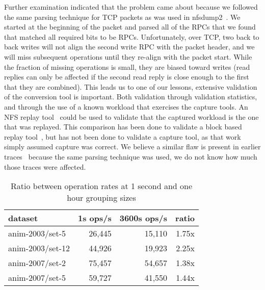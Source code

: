 Further examination indicated that the problem came about because we
followed the same parsing technique for TCP packets as was used in
nfsdump2~\cite{ellardTraces}.  We started at the beginning of the
packet and parsed all of the RPCs that we found that matched all
required bits to be RPCs.  Unfortunately, over TCP, two back to back
writes will not align the second write RPC with the packet header, and
we will miss subsequent operations until they re-align with the packet
start.  While the fraction of missing operations is small, they are
biased toward writes (read replies can only be affected if the second
read reply is close enough to the first that they are combined).  This
leads us to one of our lessons, extensive validation of the conversion
tool is important.  Both validation through validation statistics, and
through the use of a known workload that exercises the capture tools.
An NFS replay tool~\cite{NingningFast05} could be used to validate
that the captured workload is the one that was replayed.  This
comparison has been done to validate a block based replay
tool~\cite{AndersonFast04}, but has not been done to validate a
capture tool, as that work simply assumed capture was correct.
We believe a similar
flaw is present in earlier traces~\cite{ellardTraces} because the same
parsing technique was used, we do not know how much those traces were
affected.

\begin{table}
\begin{tabular}{|l|r|r|r|}
\hline
dataset & 1s ops/s & 3600s ops/s & ratio \\
\hline
anim-2003/set-5  & 26,445 & 15,110 & 1.75x \\
anim-2003/set-12 & 44,926 & 19,923 & 2.25x \\
anim-2007/set-2  & 75,457 & 54,657 & 1.38x \\
anim-2007/set-5  & 59,727 & 41,550 & 1.44x \\
\hline
\end{tabular}
\caption{Ratio between operation rates at 1 second and one hour grouping sizes}
\label{table:99quant-differences}
\end{table}

